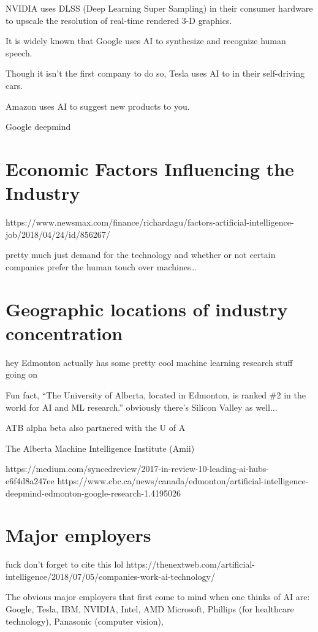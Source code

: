 \documentclass[letterpaper,12pt]{article}
\begin{document}
NVIDIA uses DLSS (Deep Learning Super Sampling) in their consumer hardware to
upscale the resolution of real-time rendered 3-D graphics.\cite{dlss}

It is widely known that Google uses AI to synthesize and recognize human speech.

Though it isn't the first company to do so, Tesla uses AI to in their self-driving cars.\cite{teslaautopilot}

Amazon uses AI to suggest new products to you.\cite{aznai}

Google deepmind

\section{Economic Factors Influencing the Industry}
https://www.newsmax.com/finance/richardagu/factors-artificial-intelligence-job/2018/04/24/id/856267/

pretty much just demand for the technology and whether or not
certain companies prefer the human touch over machines\dots

\section{Geographic locations of industry concentration}
hey Edmonton actually has some pretty cool machine learning research stuff
going on

Fun fact, ``The University of Alberta, located in Edmonton, is ranked \#2 in the world for AI and ML research.''
obviously there's Silicon Valley as well...

ATB alpha beta
also partnered with the U of A

The
Alberta
Machine
Intelligence
Institute
(Amii)

https://medium.com/syncedreview/2017-in-review-10-leading-ai-hubs-e6f4d8a247ee
https://www.cbc.ca/news/canada/edmonton/artificial-intelligence-deepmind-edmonton-google-research-1.4195026

\section{Major employers}

fuck don't forget to cite this lol https://thenextweb.com/artificial-intelligence/2018/07/05/companies-work-ai-technology/

The obvious major employers that first come to mind when one thinks of AI are:
Google,
Tesla,
IBM,
NVIDIA, Intel, AMD
Microsoft,
Phillips (for healthcare technology),
Panasonic (computer vision),
\end{document}
